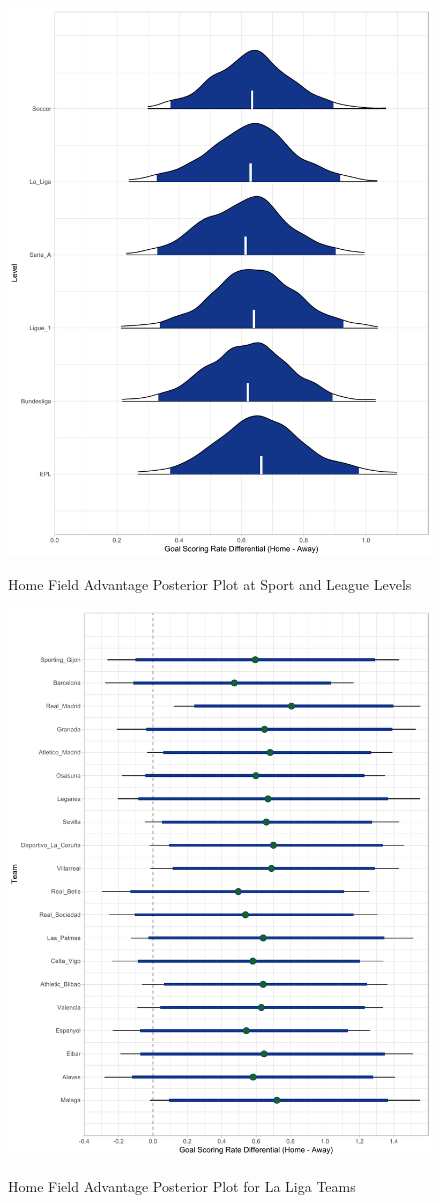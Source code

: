 \documentclass[USenglish]{article}
\begin{document}
\begin{figure}
\caption{Home Field Advantage Posterior Plot at Sport and League Levels}
{\includegraphics[width=0.80\linewidth]{HFA32.pdf}}
\label{fig2}
\end{figure}

\begin{figure}
\caption{Home Field Advantage Posterior Plot for La Liga Teams}
{\includegraphics[width=0.90\linewidth]{HFA_La_Liga11.pdf}}
\label{fig3}
\end{figure}
\end{document}
